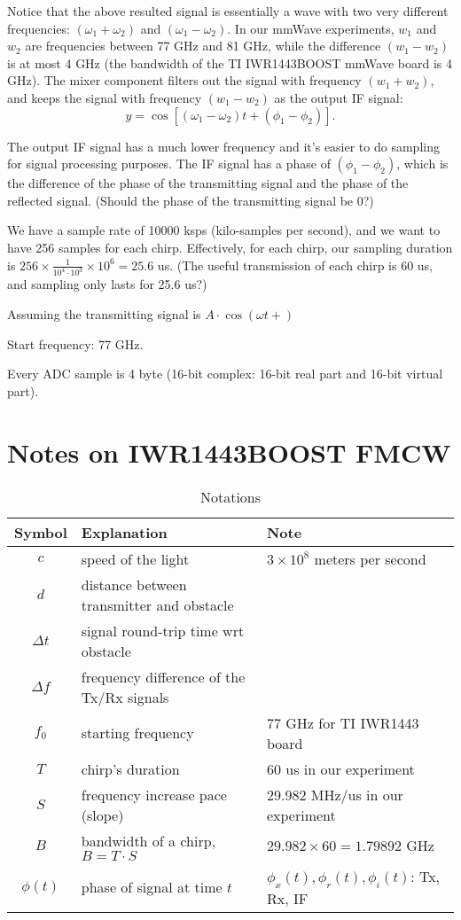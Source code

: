 \documentclass[11pt, oneside]{article}   	%
\begin{document}
Notice that the above resulted signal is essentially a wave with two very different frequencies: $(\omega_1 + \omega_2)$ and $(\omega_1 - \omega_2)$. In our mmWave experiments, $w_1$ and $w_2$ are frequencies between 77 GHz and 81 GHz, while the difference $(w_1 - w_2)$ is at most 4 GHz (the bandwidth of the TI IWR1443BOOST mmWave board is 4 GHz). The mixer component filters out the signal with frequency $(w_1 + w_2)$, and keeps the signal with frequency  $(w_1 - w_2)$ as the output IF signal:
$$y = \cos\left[(\omega_1 - \omega_2) t + (\phi_1 - \phi_2)\right].$$

The output IF signal has a much lower frequency and it's easier to do sampling for signal processing purposes. The IF signal has a phase of $(\phi_1 - \phi_2)$, which is the difference of the phase of the transmitting signal and the phase of the reflected signal. (Should the phase of the transmitting signal be 0?)

We have a sample rate of 10000 ksps (kilo-samples per second), and we want to have 256 samples for each chirp. Effectively, for each chirp, our sampling duration is $256\times\frac{1}{10^4\cdot 10^3}\times 10^6 = 25.6$ us. (The useful transmission of each chirp is 60 us, and sampling only lasts for 25.6 us?)

Assuming the transmitting signal is $A\cdot \cos(\omega t + )$

Start frequency: 77 GHz.

Every ADC sample is 4 byte (16-bit complex: 16-bit real part and 16-bit virtual part).


\section{Notes on IWR1443BOOST FMCW}

\begin{table}[t]
\centering
\caption{Notations}
\label{tab:notation}
\vspace{4pt}
\begin{tabular}{c|l|l}
\hline
\textbf{Symbol} & \textbf{Explanation} & \textbf{\centering Note} \\
\hline
\hline
$c$ & speed of the light & $3\times 10^8$ meters per second\\
\hline
$d$ & distance between transmitter and obstacle & \\
\hline
$\Delta t$ &signal round-trip time wrt obstacle & \\
\hline
$\Delta f$ & frequency difference of the Tx/Rx signals & \\
\hline
$f_0$ & starting frequency & 77 GHz for TI IWR1443 board \\
\hline
$T$ & chirp's duration & 60 us in our experiment \\
\hline
$S$ & frequency increase pace (slope) & 29.982 MHz/us in our experiment\\
\hline
$B$ & bandwidth of a chirp, $B=T\cdot S$ & $29.982 \times 60 = 1.79892$ GHz \\
\hline
$\phi(t)$ & phase of signal at time $t$ & $\phi_x(t), \phi_r(t), \phi_i(t)$: Tx, Rx, IF\\
\hline
\end{tabular}
\end{table}
\end{document}
